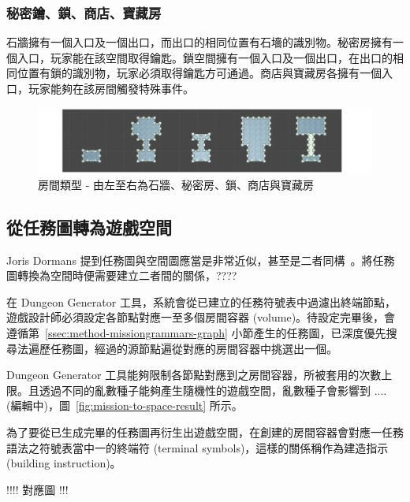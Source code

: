 \subsubsection{秘密鑰、鎖、商店、寶藏房}
\label{sssec:method-spacepieces-types-special}

石牆擁有一個入口及一個出口，而出口的相同位置有石墻的識別物。秘密房擁有一個入口，玩家能在該空間取得鑰匙。鎖空間擁有一個入口及一個出口，在出口的相同位置有鎖的識別物，玩家必須取得鑰匙方可通過。商店與寶藏房各擁有一個入口，玩家能夠在該房間觸發特殊事件。

\begin{figure}[ht]
  \begin{center}
    \includegraphics[width=1.0\textwidth]{figures/roomtype-special.png}
    \caption{房間類型 - 由左至右為石牆、秘密房、鎖、商店與寶藏房}
    \label{fig:roomtype-special}
  \end{center}
\end{figure}

\subsection{從任務圖轉為遊戲空間}
\label{ssec:method-spacepieces-frommissiontospace}

Joris Dormans 提到任務圖與空間圖應當是非常近似，甚至是二者同構~\cite{dormans2010adventures}。將任務圖轉換為空間時便需要建立二者間的關係，????

在 Dungeon Generator 工具，系統會從已建立的任務符號表中過濾出終端節點，遊戲設計師必須設定各節點對應一至多個房間容器 (volume)。待設定完畢後，會遵循第~\ref{ssec:method-missiongrammars-graph} 小節產生的任務圖，已深度優先搜尋法遍歷任務圖，經過的源節點遍從對應的房間容器中挑選出一個。

Dungeon Generator 工具能夠限制各節點對應到之房間容器，所被套用的次數上限。且透過不同的亂數種子能夠產生隨機性的遊戲空間，亂數種子會影響到 .... (編輯中)，圖~\ref{fig:mission-to-space-result} 所示。

為了要從已生成完畢的任務圖再衍生出遊戲空間，在創建的房間容器會對應一任務語法之符號表當中一的終端符 (terminal symbols)，這樣的關係稱作為建造指示 (building instruction)。

!!!! 對應圖 !!!

